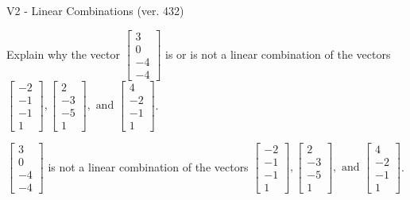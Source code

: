 \begin{exercise}
  \begin{exerciseTitle}V2 - Linear Combinations (ver. 432)\end{exerciseTitle}
  \begin{exerciseStatement}
    Explain why the vector \(\left[\begin{array}{c}
3 \\
0 \\
-4 \\
-4
\end{array}\right]\)  is or is not a linear 
	combination of the vectors \(\left[\begin{array}{c}
-2 \\
-1 \\
-1 \\
1
\end{array}\right] , \left[\begin{array}{c}
2 \\
-3 \\
-5 \\
1
\end{array}\right] , \text{ and } \left[\begin{array}{c}
4 \\
-2 \\
-1 \\
1
\end{array}\right]\).
	


  \end{exerciseStatement}
  \begin{exerciseAnswer}
   \(\left[\begin{array}{c}
3 \\
0 \\
-4 \\
-4
\end{array}\right]\) 
  	 is not  
	a linear combination of the vectors \(\left[\begin{array}{c}
-2 \\
-1 \\
-1 \\
1
\end{array}\right] , \left[\begin{array}{c}
2 \\
-3 \\
-5 \\
1
\end{array}\right] , \text{ and } \left[\begin{array}{c}
4 \\
-2 \\
-1 \\
1
\end{array}\right]\).

	
  


  \end{exerciseAnswer}
\end{exercise}